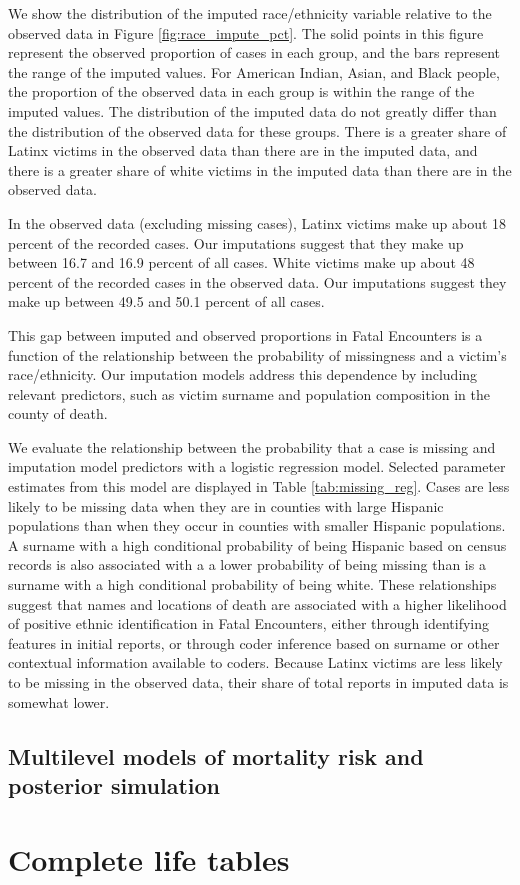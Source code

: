 \documentclass{article}
\begin{document}
We show the distribution of the imputed race/ethnicity variable relative to the observed data in Figure \ref{fig:race_impute_pct}. The solid points in this figure represent the observed proportion of cases in each group, and the bars represent the range of the imputed values. For American Indian, Asian, and Black people, the proportion of the observed data in each group is within the range of the imputed values. The distribution of the imputed data do not greatly differ than the distribution of the observed data for these groups. There is a greater share of Latinx victims in the observed data than there are in the imputed data, and there is a greater share of white victims in the imputed data than there are in the observed data. 

In the observed data (excluding missing cases), Latinx victims make up about 18 percent of the recorded cases. Our imputations suggest that they make up between 16.7 and 16.9 percent of all cases. White victims make up about 48 percent of the recorded cases in the observed data. Our imputations suggest they make up between 49.5 and 50.1 percent of all cases. 

This gap between imputed and observed proportions in Fatal Encounters is a function of the relationship between the probability of missingness and a victim's race/ethnicity. Our imputation models address this dependence by including relevant predictors, such as victim surname and population composition in the county of death. 



We evaluate the relationship between the probability that a case is missing and imputation model predictors with a logistic regression model. Selected parameter estimates from this model are displayed in Table \ref{tab:missing_reg}. Cases are less likely to be missing data when they are in counties with large Hispanic populations than when they occur in counties with smaller Hispanic populations. A surname with a high conditional probability of being Hispanic based on census records is also associated with a a lower probability of being missing than is a surname with a high conditional probability of being white. These relationships suggest that names and locations of death are associated with a higher likelihood of positive ethnic identification in Fatal Encounters, either through identifying features in initial reports, or through coder inference based on surname or other contextual information available to coders. Because Latinx victims are less likely to be missing in the observed data, their share of total reports in imputed data is somewhat lower. 

\subsection{Multilevel models of mortality risk and posterior simulation}

\section{Complete life tables}
\end{document}
